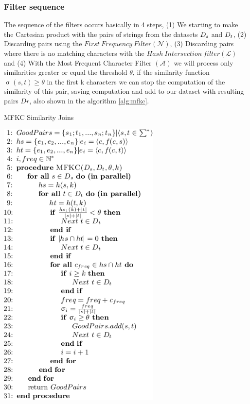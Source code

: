 
\subsubsection{Filter sequence}

The sequence of the filters occurs basically in 4 steps, (1) We starting to make the Cartesian product with the pairs of strings from the datasets ${D_s}{}$ and ${D_t}{}$, (2) Discarding pairs using the $First~Frequency~Filter(\mathcal{N})$, (3) Discarding pairs where there is no matching characters with the $Hash~Intersection~filter (\mathcal{L})$ and (4) With the Most Frequent Character Filter $(\mathcal{A})$ we will process only similarities greater or equal the threshold $\theta$, if the similarity function $\upsigma(s,t) \geq \theta$ in the first k characters we can stop the computation of the similarity of this pair, saving computation and add to our dataset with resulting pairs $Dr$, also shown in the algorithm \ref{alg:mfkc}.


\begin{algorithm}[htb] 
	\caption{MFKC Similarity Joins}
	\label{alg:mfkc}
	\includegraphics[width=230pt]{sections/img/algMFKC.png}
\end{algorithm}


